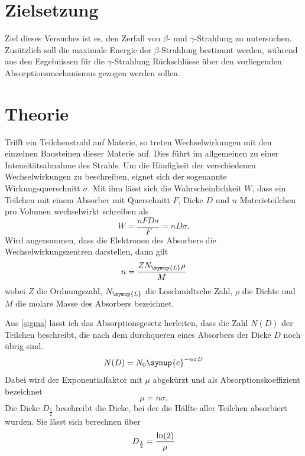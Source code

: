 \section{Zielsetzung}
Ziel dieses Versuches ist es, den Zerfall von $\beta$- und $\gamma$-Strahlung zu untersuchen.
Zusätzlich soll die maximale Energie der $\beta$-Strahlung bestimmt werden, während
aus den Ergebnissen für die $\gamma$-Strahlung Rückschlüsse über den vorliegenden
Absorptionsmechanismus gezogen werden sollen.

\section{Theorie}
\label{sec:Theorie}

Trifft ein Teilchenstrahl auf Materie, so treten Wechselwirkungen mit den einzelnen Bausteinen dieser
Materie auf. Dies führt im allgemeinen zu einer Intensitätsabnahme des Strahls.
Um die Häufigkeit der verschiedenen Wechselwirkungen zu beschreiben, eignet sich der sogenannte
Wirkungsquerschnitt $\sigma$.
Mit ihm lässt sich die Wahrscheinlichkeit $W$, dass ein Teilchen mit einem Absorber mit Querschnitt $F$,
Dicke $D$ und $n$ Materieteilchen pro Volumen wechselwirkt schreiben als
\begin{equation}
    \label{sigma}
    W=\frac{nFD\sigma}{F}=nD\sigma.
\end{equation}
Wird angenommen, dass die Elektronen des Absorbers die Wechselwirkungszentren darstellen, dann gilt
\begin{equation}
    \label{n}
    n=\frac{Z N_{\symup{L}} \rho}{M}
\end{equation}
wobei $Z$ die Ordnungszahl, $N_{\symup{L}}$ die Loschmidtsche Zahl, $\rho$ die Dichte und $M$
die molare Masse des Absorbers bezeichnet.

Aus \eqref{sigma} lässt ich das Absorptionsgesetz herleiten, dass die Zahl $N(D)$ der Teilchen beschreibt, die nach dem
durchqueren eines Absorbers der Dicke $D$ noch übrig sind.
\begin{equation}
    \label{Absorptionsgesetz}
    N(D)=N_0 \symup{e}^{-n \sigma D}
\end{equation}
Dabei wird der Exponentialfaktor mit $\mu$ abgekürzt und als Absorptionskoeffizient bezeichnet
\begin{equation}
    \label{mu}
    \mu =n\sigma.
\end{equation}
Die Dicke $D_{\frac{1}{2}}$ beschreibt die Dicke, bei der die Hälfte aller Teilchen absorbiert wurden.
Sie lässt sich berechnen über
\begin{equation}
    D_{\frac{1}{2}}=\frac{\ln(2)}{\mu} \notag
\end{equation}

